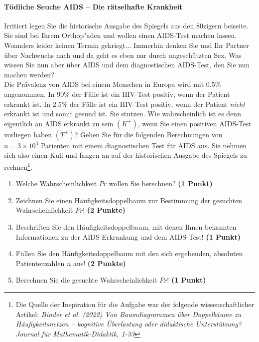 \documentclass[a4paper, 9pt]{scrartcl}\usepackage[]{graphicx}\usepackage[]{xcolor}
\begin{document}
\paragraph{T{\"o}dliche Seuche AIDS -- Die r{\"a}tselhafte Krankheit}




Irritiert legen Sie die historische Ausgabe des Spiegels aus den 80zigern
beiseite. Sie sind bei Ihrem Orthop{"a}den und wollen einen AIDS-Test machen
lassen. Woanders leider keinen Termin gekriegt... Immerhin denken Sie und
Ihr Partner {\"u}ber Nachwuchs nach und da geht es eben nur durch
ungesch{\"u}tzten Sex. Was wissen Sie nun aber {\"u}ber AIDS und dem diagnostischen
AIDS-Test, den Sie nun machen werden?\\

Die Pr{\"a}valenz von AIDS bei einem Menschen in Europa wird mit
0.5\% angenommen. In 90\% der F{\"a}lle ist ein
HIV-Test positiv, wenn der Patient erkrankt ist. In 2.5\%
der F{\"a}lle ist ein HIV-Test positiv, wenn der Patient \textit{nicht}
erkrankt ist und somit gesund ist. Sie stutzen. Wie wahrscheinlich ist es
denn eigentlich an AIDS erkrankt zu sein $(K^+)$, wenn Sie einen positiven
AIDS-Test vorliegen haben $(T^+)$? Gehen Sie f{\"u}r die folgenden Berechnungen
von $n = \ensuremath{3\times 10^{4}}$ Patienten mit einem diagnostischen Test f{\"u}r AIDS
aus. Sie nehmen sich also einen Kuli und fangen an auf der historischen
Ausgabe des Spiegels zu rechnen\footnote{Die Quelle der Inspiration f{\"u}r die
  Aufgabe war der folgende wissenschaftlicher Artikel: \textit{Binder et
    al. (2022) Von Baumdiagrammen {\"u}ber Doppelb{\"a}ume zu H{\"a}ufigkeitsnetzen --
    kognitive {\"U}berlastung oder didaktische Unterst{\"u}tzung? Journal f{\"u}r
    Mathematik-Didaktik, 1-33}}.

\begin{enumerate}
\item Welche Wahrscheinlichkeit $Pr$ wollen Sie berechnen? \textbf{(1 Punkt)}
\item Zeichnen Sie einen H{\"a}ufigkeitsdoppelbaum zur Bestimmung der gesuchten
  Wahrscheinlichkeit $Pr$! \textbf{(2 Punkte)} 
\item Beschriften Sie den H{\"a}ufigkeitsdoppelbaum, mit denen Ihnen bekannten
  Informationen zu der AIDS Erkrankung und dem AIDS-Test! \textbf{(1 Punkt)}
\item F{\"u}llen Sie den H{\"a}ufigkeitsdoppelbaum mit den sich ergebenden,
  absoluten Patientenzahlen $n$ aus! \textbf{(2 Punkte)}
\item Berechnen Sie die gesuchte Wahrscheinlichkeit $Pr$! \textbf{(1 Punkt)}
\end{enumerate}
\end{document}
